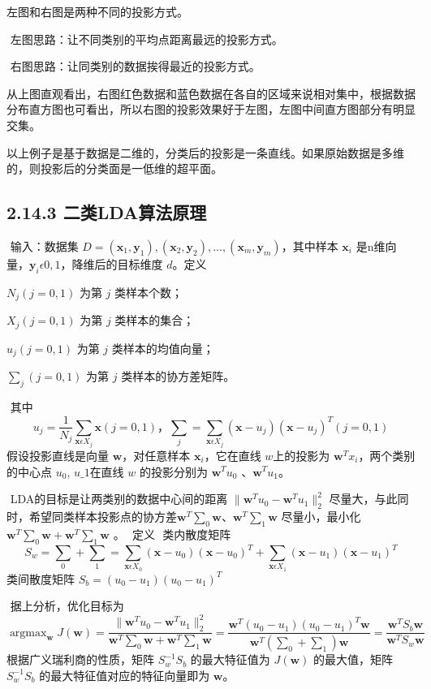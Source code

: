左图和右图是两种不同的投影方式。

​ 左图思路：让不同类别的平均点距离最远的投影方式。

​ 右图思路：让同类别的数据挨得最近的投影方式。

​
从上图直观看出，右图红色数据和蓝色数据在各自的区域来说相对集中，根据数据分布直方图也可看出，所以右图的投影效果好于左图，左图中间直方图部分有明显交集。

​
以上例子是基于数据是二维的，分类后的投影是一条直线。如果原始数据是多维的，则投影后的分类面是一低维的超平面。

\subsection{2.14.3
二类LDA算法原理}\label{ux4e8cux7c7bldaux7b97ux6cd5ux539fux7406}

​ 输入：数据集
$D={(\boldsymbol x_1,\boldsymbol y_1),(\boldsymbol x_2,\boldsymbol y_2),...,(\boldsymbol x_m,\boldsymbol y_m)}​$，其中样本
$\boldsymbol x_i ​$
是n维向量，$\boldsymbol y_i \epsilon {0, 1}​$，降维后的目标维度
$d​$。定义

​ $N_j(j=0,1)$ 为第 $j$ 类样本个数；

​ $X_j(j=0,1)$ 为第 $j$ 类样本的集合；

​ $u_j(j=0,1)​$ 为第 $j​$ 类样本的均值向量；

​ $\sum_j(j=0,1)$ 为第 $j$ 类样本的协方差矩阵。

​ 其中 \[
u_j = \frac{1}{N_j} \sum_{\boldsymbol x\epsilon X_j}\boldsymbol x(j=0,1)， 
\sum_j = \sum_{\boldsymbol x\epsilon X_j}(\boldsymbol x-u_j)(\boldsymbol x-u_j)^T(j=0,1)
\] ​ 假设投影直线是向量 $\boldsymbol w$，对任意样本
$\boldsymbol x_i$，它在直线 $w$上的投影为
$\boldsymbol w^Tx_i$，两个类别的中心点 $u_0$, $u\_1 $在直线 $w$
的投影分别为 $\boldsymbol w^Tu_0$ 、$\boldsymbol w^Tu_1$。

​ LDA的目标是让两类别的数据中心间的距离
$\| \boldsymbol w^Tu_0 - \boldsymbol w^Tu_1 \|^2_2$
尽量大，与此同时，希望同类样本投影点的协方差$\boldsymbol w^T \sum_0 \boldsymbol w$、$\boldsymbol w^T \sum_1 \boldsymbol w$
尽量小，最小化
$\boldsymbol w^T \sum_0 \boldsymbol w + \boldsymbol w^T \sum_1 \boldsymbol w​$
。 ​ 定义 ​ 类内散度矩阵 \[
S_w = \sum_0 + \sum_1 = 
    \sum_{\boldsymbol x\epsilon X_0}(\boldsymbol x-u_0)(\boldsymbol x-u_0)^T + 
    \sum_{\boldsymbol x\epsilon X_1}(\boldsymbol x-u_1)(\boldsymbol x-u_1)^T
\] ​ 类间散度矩阵 $S_b = (u_0 - u_1)(u_0 - u_1)^T$

​ 据上分析，优化目标为
\[
\mathop{\arg\max}_\boldsymbol w J(\boldsymbol w) = \frac{\| \boldsymbol w^Tu_0 - \boldsymbol w^Tu_1 \|^2_2}{\boldsymbol w^T \sum_0\boldsymbol w + \boldsymbol w^T \sum_1\boldsymbol w} = 
\frac{\boldsymbol w^T(u_0-u_1)(u_0-u_1)^T\boldsymbol w}{\boldsymbol w^T(\sum_0 + \sum_1)\boldsymbol w} =
\frac{\boldsymbol w^TS_b\boldsymbol w}{\boldsymbol w^TS_w\boldsymbol w}
\] ​ 根据广义瑞利商的性质，矩阵 $S^{-1}_{w} S_b$ 的最大特征值为
$J(\boldsymbol w)$ 的最大值，矩阵 $S^{-1}_{w} S_b$
的最大特征值对应的特征向量即为 $\boldsymbol w$。

